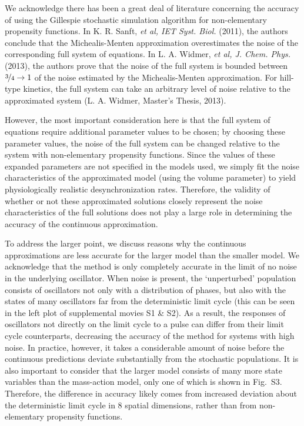 \documentclass[11pt, letterpaper]{article}
\begin{document}
We acknowledge there has been a great deal of literature concerning the accuracy of using the Gillespie stochastic simulation algorithm for non-elementary propensity functions.
In K. R. Sanft, {\itshape et al, IET Syst. Biol.} (2011), the authors conclude that the Michealis-Menten approximation overestimates the noise of the corresponding full system of equations.
In L. A. Widmer, {\itshape et al, J. Chem. Phys.} (2013), the authors prove that the noise of the full system is bounded between $\nicefrac{3}{4} \to 1$ of the noise estimated by the Michealis-Menten approximation.
For hill-type kinetics, the full system can take an arbitrary level of noise relative to the approximated system (L. A. Widmer, Master's Thesis, 2013).

However, the most important consideration here is that the full system of equations require additional parameter values to be chosen; by choosing these parameter values, the noise of the full system can be changed relative to the system with non-elementary propensity functions.
Since the values of these expanded parameters are not specified in the models used, we simply fit the noise characteristics of the approximated model (using the volume parameter) to yield physiologically realistic desynchronization rates.
Therefore, the validity of whether or not these approximated solutions closely represent the noise characteristics of the full solutions does not play a large role in determining the accuracy of the continuous approximation.

To address the larger point, we discuss reasons why the continuous approximations are less accurate for the larger model than the smaller model. 
We acknowledge that the method is only completely accurate in the limit of no noise in the underlying oscillator.
When noise is present, the `unperturbed' population consists of oscillators not only with a distribution of phases, but also with the states of many oscillators far from the deterministic limit cycle (this can be seen in the left plot of supplemental movies S1 \& S2).
As a result, the responses of oscillators not directly on the limit cycle to a pulse can differ from their limit cycle counterparts, decreasing the accuracy of the method for systems with high noise.
In practice, however, it takes a considerable amount of noise before the continuous predictions deviate substantially from the stochastic populations.
It is also important to consider that the larger model consists of many more state variables than the mass-action model, only one of which is shown in Fig.~S3.
Therefore, the difference in accuracy likely comes from increased deviation about the deterministic limit cycle in 8 spatial dimensions, rather than from non-elementary propensity functions.
\end{document}
